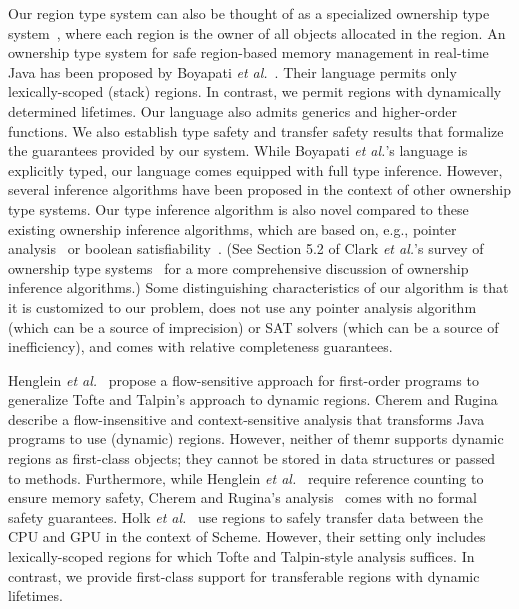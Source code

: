 \documentclass[a4paper,UKenglish]{lipics-v2018}
\begin{document}
Our region type system can also be thought of as a specialized
ownership type system~\cite{OwnershipSurvey}, where each region is the
owner of all objects allocated in the region.
%
An ownership type system for safe region-based memory management in
real-time Java has been proposed by Boyapati \emph{et
al.}~\cite{MIT03}.  Their language permits only lexically-scoped
(stack) regions.  In contrast, we permit regions with dynamically
determined lifetimes.  Our language also admits generics and
higher-order functions.  We also establish type safety and transfer
safety results that formalize the guarantees provided by our system.
While Boyapati \emph{et al.}'s language is explicitly typed, our
language comes equipped with full type inference.  However, several
inference algorithms have been proposed in the context of other
ownership type systems.  Our type inference algorithm is also novel
compared to these existing ownership inference algorithms, which are
based on, e.g., pointer analysis~\cite{HuangEtAl:ECOOP12} or boolean
satisfiability~\cite{DietlEtAl:ECOOP11}.  (See Section 5.2 of Clark
\emph{et al.}'s survey of ownership type
systems~\cite{OwnershipSurvey} for a more comprehensive discussion of
ownership inference algorithms.) Some distinguishing characteristics
of our algorithm is that it is customized to our problem, does not use
any pointer analysis algorithm (which can be a source of imprecision)
or SAT solvers (which can be a source of inefficiency), and comes with
relative completeness guarantees.


Henglein \emph{et al.}~\cite{HMN01} propose a flow-sensitive approach
for first-order programs to generalize Tofte and Talpin's approach to
dynamic regions. Cherem and Rugina~\cite{CR04} describe a
flow-insensitive and context-sensitive analysis that transforms Java
programs to use (dynamic) regions.  However, neither of themr supports
dynamic regions as first-class objects; they cannot be stored in data
structures or passed to methods. Furthermore, while Henglein \emph{et
al.}~\cite{HMN01} require reference counting to ensure memory safety,
Cherem and Rugina's analysis~\cite{CR04} comes with no formal safety
guarantees.
%
Holk \emph{et al.}~\cite{gpu14} use regions to safely transfer data
between the CPU and GPU in the context of Scheme. However, their
setting only includes lexically-scoped regions for which Tofte and
Talpin-style analysis suffices. In contrast, we provide first-class
support for transferable regions with dynamic lifetimes.


\end{document}
